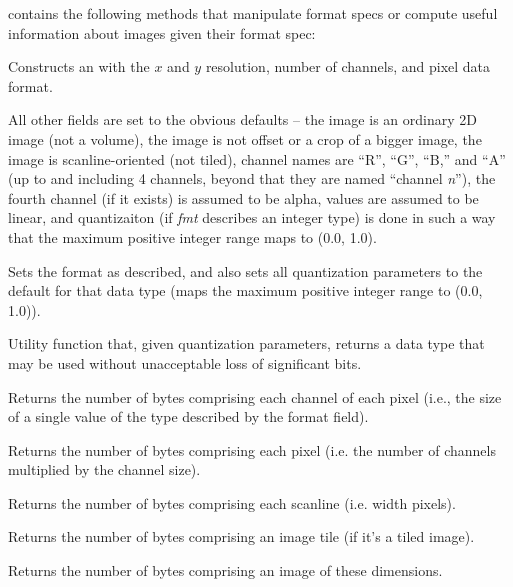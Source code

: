 \noindent \ImageSpec contains the following methods that
manipulate format specs or compute useful information about images given
their format spec:

Constructs an \ImageSpec with the $x$ and $y$ resolution, number
of channels, and pixel data format.

All other fields are set to the obvious defaults -- the image is an
ordinary 2D image (not a volume), the image is not offset or a crop of a
bigger image, the image is scanline-oriented (not tiled), channel names
are ``R'', ``G'', ``B,'' and ``A'' (up to and including 4 channels,
beyond that they are named ``channel \emph{n}''), the fourth channel (if
it exists) is assumed to be alpha, values are assumed to be linear, and
quantizaiton (if \emph{fmt} describes an integer type) is done in
such a way that the maximum positive integer range maps to (0.0, 1.0).
\apiend

Sets the format as described, and also sets all quantization parameters
to the default for that data type (maps the maximum positive integer
range to (0.0, 1.0)).
\apiend

Utility function that, given quantization parameters, returns a data
type that may be used without unacceptable loss of significant bits.
\apiend

Returns the number of bytes comprising each channel of each pixel (i.e.,
the size of a single value of the type described by the {\kw format} field).
\apiend

Returns the number of bytes comprising each pixel (i.e. the number of
channels multiplied by the channel size).
\apiend

Returns the number of bytes comprising each scanline (i.e. {\kw width} pixels).
\apiend

Returns the number of bytes comprising an image tile (if it's a tiled image).
\apiend

Returns the number of bytes comprising an image of these dimensions.
\apiend

